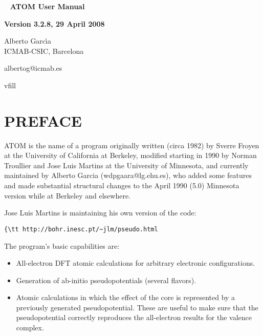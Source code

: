 \documentclass[11pt]{article}
\begin{document}

\begin{titlepage}

\begin{center}
~
\vfill
\vspace{1cm}
{\Huge {\bf ATOM User Manual}}
\par\vspace{3cm}
\hrulefill
\par\vspace{3cm}
{\Large {\bf Version 3.2.8, 29 April 2008}}
\par\vspace{2cm}
\hrulefill

{\Large Alberto Garc\'{\i}a \\
ICMAB-CSIC, Barcelona

albertog@icmab.es}
vfill
\end{center}

\end{titlepage}

\tableofcontents
\newpage

\section{PREFACE}

{\sc ATOM} is the name of a program originally written (circa 1982) by
Sverre Froyen at the University of California at Berkeley, modified
starting in 1990 by Norman Troullier and Jose Luis Martins at the
University of Minnesota, and currently maintained by Alberto Garcia
(wdpgaara@lg.ehu.es), who added some features and made substantial
structural changes to the April 1990 (5.0) Minnesota version while at
Berkeley and elsewhere.

Jose Luis Martins is maintaining his own version of the code:
\begin{verbatim}{\tt http://bohr.inesc.pt/~jlm/pseudo.html\end{verbatim}


The program's basic capabilities are:

\begin{itemize}
\item All-electron DFT atomic calculations for arbitrary electronic
configurations.

\item Generation of ab-initio pseudopotentials (several flavors).

\item Atomic calculations in which the effect of the core is represented
by a previously generated pseudopotential. These are useful to make
sure that the pseudopotential correctly reproduces the all-electron
results for the valence complex.

\end{itemize}
\end{document}
